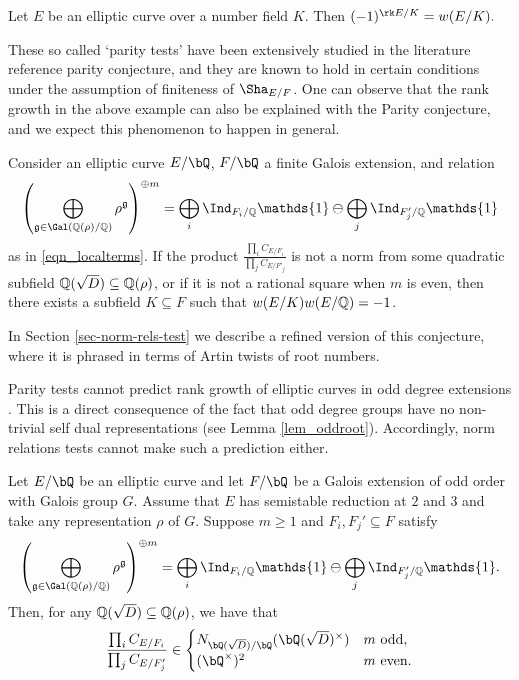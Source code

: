 \begin{conj}\label{conj_parity}
    Let $E$ be an elliptic curve over a number field $K$. Then
    $(-1)^{\rk E / K} = w(E / K).$
\end{conj}

These so called `parity tests' have been extensively studied in the literature {\color{red} reference parity conjecture}, and they are known to hold in certain conditions under the assumption of finiteness of $\Sha_{E/F}$. One can observe that the rank growth in the above example can also be explained with the Parity conjecture, and we expect this phenomenon to happen in general. 

\begin{conj}\label{conj_normroot}
    Consider an elliptic curve $E / \bQ$, $F / \bQ$ a finite Galois extension, and relation 
    $$\left(\bigoplus_{\mathfrak{g}\in\Gal(\QQ(\rho)/\QQ)}\rho^{\mathfrak{g}}\right)^{\oplus m}=\bigoplus_i\Ind_{F_i/\QQ}\mathds{1}\ominus\bigoplus_j\Ind_{F'_j/\QQ}\mathds{1}$$
    as in \eqref{eqn_localterms}. If the product $\frac{\prod_i C_{E/F_i}}{\prod_j C_{E/F'_j}}$ is not a norm from some quadratic subfield $\mathbb{Q}(\sqrt{D})\subseteq\mathbb{Q}(\rho)$, or if it is not a rational square when $m$ is even, then there exists a subfield $K\subseteq F$ such that $w(E/K)w(E/\mathbb{Q})=-1$. 
\end{conj}

In Section \ref{sec-norm-rels-test} we describe a refined version of this conjecture, where it is phrased in terms of Artin twists of root numbers.

Parity tests cannot predict rank growth of elliptic curves in odd degree extensions . This is a direct consequence of the fact that odd degree groups have no non-trivial self dual representations (see Lemma \ref{lem_oddroot}). Accordingly, norm relations tests cannot make such a prediction either.

\begin{thm}\label{thm_odd-cons}
    Let $E / \bQ$ be an elliptic curve and let $F / \bQ$ be a Galois extension of odd order with Galois group $G$. Assume that $E$ has semistable reduction at $2$ and $3$ and take any representation $\rho$ of $G$. Suppose $m\geq 1$ and $F_i,F_j'\subseteq F$ satisfy 
    \begin{equation*}%
        \left(\bigoplus_{\mathfrak{g}\in\Gal(\QQ(\rho)/\QQ)}\rho^{\mathfrak{g}}\right)^{\oplus m }=\bigoplus_i\Ind_{F_i/\QQ}\mathds{1}\ominus\bigoplus_j\Ind_{F'_j/\QQ}\mathds{1}.
    \end{equation*}
    Then, for any $\mathbb{Q}(\sqrt{D})\subseteq\mathbb{Q}(\rho)$, we have that
    \[ \frac{\prod_i C_{E/F_i}}{\prod_j C_{E/F_j'}}  \in 
       \begin{cases}
           N_{\bQ(\sqrt{D}) / \bQ}(\bQ(\sqrt{D})^{\times}) & m \ \text{odd}, \\
           (\bQ^{\times})^2 & m \ \text{even}.
       \end{cases} 
    \] 
\end{thm}

